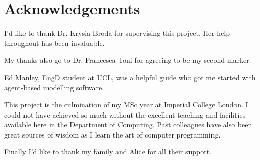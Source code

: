 \section*{Acknowledgements}

I'd like to thank Dr. Krysia Broda for supervising this project. Her help throughout has been invaluable. 

My thanks also go to Dr. Francesca Toni for agreeing to be my second marker.

Ed Manley, EngD student at UCL, was a helpful guide who got me started with agent-based modelling software.

This project is the culmination of my MSc year at Imperial College London. I could not have achieved so much without the excellent teaching and facilities available here in the Department of Computing. Past colleagues have also been great sources of wisdom as I learn the art of computer programming.

Finally I'd like to thank my family and Alice for all their support.